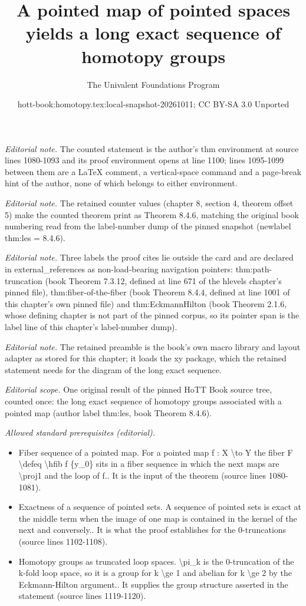 \documentclass[10pt,a4paper]{article}
\title{A pointed map of pointed spaces yields a long exact sequence of homotopy groups}
\author{The Univalent Foundations Program}
\date{hott-book:homotopy.tex:local-snapshot-20261011; CC BY-SA 3.0 Unported}
\newcounter{chapter}
\theoremstyle{definition}
\theoremstyle{remark}
\numberwithin{equation}{section}
\begin{document}
\maketitle
\setcounter{chapter}{8}
\setcounter{section}{4}
\setcounter{thm}{5}
\noindent\textit{Editorial note.} The counted statement is the author's thm environment at source lines 1080-1093 and its proof environment opens at line 1100; lines 1095-1099 between them are a LaTeX comment, a vertical-space command and a page-break hint of the author, none of which belongs to either environment.\par\medskip
\noindent\textit{Editorial note.} The retained counter values (chapter 8, section 4, theorem offset 5) make the counted theorem print as Theorem 8.4.6, matching the original book numbering read from the label-number dump of the pinned snapshot (newlabel thm:les = 8.4.6).\par\medskip
\noindent\textit{Editorial note.} Three labels the proof cites lie outside the card and are declared in external\_references as non-load-bearing navigation pointers: thm:path-truncation (book Theorem 7.3.12, defined at line 671 of the hlevels chapter's pinned file), thm:fiber-of-the-fiber (book Theorem 8.4.4, defined at line 1001 of this chapter's own pinned file) and thm:EckmannHilton (book Theorem 2.1.6, whose defining chapter is not part of the pinned corpus, so its pointer span is the label line of this chapter's label-number dump).\par\medskip
\noindent\textit{Editorial note.} The retained preamble is the book's own macro library and layout adapter as stored for this chapter; it loads the xy package, which the retained statement needs for the diagram of the long exact sequence.\par\medskip
\noindent\textit{Editorial scope.} One original result of the pinned HoTT Book source tree, counted once: the long exact sequence of homotopy groups associated with a pointed map (author label thm:les, book Theorem 8.4.6).\par\medskip
\noindent\textit{Allowed standard prerequisites (editorial).}\begin{itemize}
\item Fiber sequence of a pointed map. For a pointed map f : X \textbackslash{}to Y the fiber F \textbackslash{}defeq \textbackslash{}hfib f \{y\_0\} sits in a fiber sequence in which the next maps are \textbackslash{}proj1 and the loop of f.. It is the input of the theorem (source lines 1080-1081).
\item Exactness of a sequence of pointed sets. A sequence of pointed sets is exact at the middle term when the image of one map is contained in the kernel of the next and conversely.. It is what the proof establishes for the 0-truncations (source lines 1102-1108).
\item Homotopy groups as truncated loop spaces. \textbackslash{}pi\_k is the 0-truncation of the k-fold loop space, so it is a group for k \textbackslash{}ge 1 and abelian for k \textbackslash{}ge 2 by the Eckmann-Hilton argument.. It supplies the group structure asserted in the statement (source lines 1119-1120).
\end{itemize}\medskip
\end{document}
